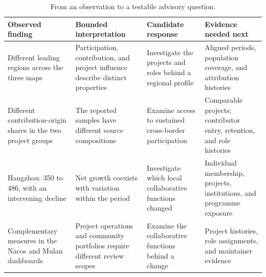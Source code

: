 \begin{table}[tbp]
\caption{From an observation to a testable advisory question.}
\label{tab:ch10-findings}
\centering\small\setlength{\tabcolsep}{4pt}\renewcommand{\arraystretch}{1.18}
\begin{tabularx}{\linewidth}{@{}>{\raggedright\arraybackslash}p{.22\linewidth}*{3}{>{\raggedright\arraybackslash}X}@{}}
\toprule
Observed finding & Bounded interpretation & Candidate response & Evidence needed next \\
\midrule
Different leading regions across the three maps & Participation, contribution, and project influence describe distinct properties & Investigate the projects and roles behind a regional profile & Aligned periods, population coverage, and attribution histories \\
\addlinespace
Different contribution-origin shares in the two project groups & The reported samples have different source compositions & Examine access to sustained cross-border participation & Comparable projects; contributor entry, retention, and role histories \\
\addlinespace
Hangzhou: 350 to 486, with an intervening decline & Net growth coexists with variation within the period & Investigate which local collaborative functions changed & Individual membership, projects, institutions, and programme exposure \\
\addlinespace
Complementary measures in the Nacos and Mulan dashboards & Project operations and community portfolios require different review scopes & Examine the collaborative functions behind a change & Project histories, role assignments, and maintainer evidence \\
\bottomrule
\end{tabularx}
\end{table}
